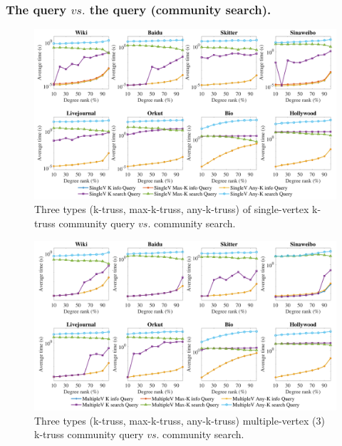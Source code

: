 \subsubsection{The \toplevelprob{} query $vs.$ the \bottomlevelprob{} query (community search).}
\label{eval_top_bottom_compare}

\begin{figure}[t]
    \centering
    \includegraphics[width=0.8\linewidth]{./figures/singlev_info_query.pdf}
    \caption{Three types (k-truss, max-k-truss, any-k-truss) of single-vertex \toplevelprob{} k-truss community query $vs.$ community search.}
    \label{fig:singlev_info_query}
\end{figure}


\begin{figure}[t]
    \centering
    \includegraphics[width=0.8\linewidth]{./figures/multiplev_3_info_query.pdf}
    \caption{Three types (k-truss, max-k-truss, any-k-truss) multiple-vertex ($3$) \toplevelprob{} k-truss community query $vs.$ community search.}
    \label{fig:multiplev_3_info_query}
\end{figure}

